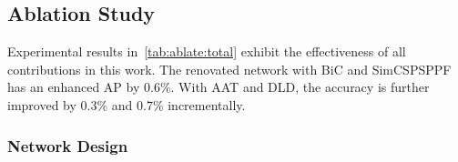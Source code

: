 \documentclass[10pt,twocolumn,letterpaper]{article}
\begin{document}
  \begin{table}[!thbp]
    \begin{center}
    \end{center}
    \caption{Effectiveness of the BiC module on YOLOv6.}
    \label{tab:ablate:neck:bic}
  \end{table}


\subsection{Ablation Study}
Experimental results in~\cref{tab:ablate:total} exhibit the effectiveness of all contributions in this work. The renovated network with BiC and SimCSPSPPF has an enhanced AP by 0.6\%. With AAT and DLD, the accuracy is further improved by 0.3\% and 0.7\% incrementally.


\subsubsection{Network Design}
\end{document}

